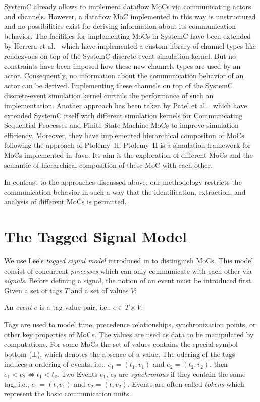 SystemC \cite{glms:2002} already allows to implement
dataflow MoCs via communicating actors and  channels.
However, a dataflow MoC implemented in this way is unstructured
and no possibilities exist for deriving information about its
communication behavior. The facilities for implementing MoCs in
SystemC have been extended by Herrera et al.~\cite{herrerasystemc:2004}
which have implemented a custom library of channel types like rendezvous
on top of the SystemC discrete-event simulation kernel. But no
constraints have been imposed how these new channels types are used by
an actor. Consequently, no information about the communication behavior
of an actor can be derived.
Implementing these channels on top of the SystemC discrete-event
simulation kernel curtails the performance of such an implementation.
Another approach has been taken by Patel et al.~\cite{fermatmoc:2004}
which have extended SystemC itself with different simulation kernels
for Communicating Sequential Processes and Finite State Machine MoCs
to improve simulation efficiency. Moreover,
they have implemented hierarchical compositon of MoCs following
the approach of \hbox{Ptolemy II}. \hbox{Ptolemy II} \cite{ptolemyII} is a simulation
framework for MoCs implemented in Java. Its aim is the exploration of
different MoCs and the semantic of hierarchical composition of these MoC
with each other.

In contrast to the approaches discussed above, our methodology restricts
the communication behavior in such a way that the identification,
extraction, and analysis of different MoCs is permitted.

\section{The Tagged Signal Model}\label{lee-tsm}

We use Lee's \emph{tagged signal model} introduced in \cite{Lee98} to
distinguish MoCs. This model consist of concurrent \emph{processes} which
can only communicate with each other via \emph{signals}.
Before defining a signal, the notion of an event must be introduced first.
Given a set of tags $T$ and a set of values $V$:
\begin{sdefinition}
An \emph{event} $e$ is a  tag-value pair, i.e., $e \in T \times V$.
\end{sdefinition}
Tags are used to model time,
precedence relationships, synchronization points, or other key properties
of MoCs. The values are used as data to be manipulated by computations.
For some MoCs the set of values contains the special symbol bottom ($\bot$),
which denotes the absence of a value. The odering of the tags induces
a ordering of events, i.e., $e_1 = (t_1,v_1)$ and $e_2 = (t_2,v_2)$, then $e_1 < e_2 \iff t_1 < t_2$.
Two Events $e_1$, $e_2$ are \emph{synchronous} if they contain
the same tag, i.e., $e_1 = (t,v_1)$ and $e_2 = (t,v_2)$.
Events are often called \emph{tokens} which represent the basic communication units.

